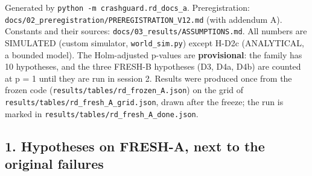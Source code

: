 


Generated by \texttt{python -m crashguard.rd\_docs\_a}. Preregistration: \texttt{docs/02\_preregistration/PREREGISTRATION\_V12.md} (with addendum A). Constants and their sources: \texttt{docs/03\_results/ASSUMPTIONS.md}. All numbers are SIMULATED (custom simulator, \texttt{world\_sim.py}) except H-D2c (ANALYTICAL, a bounded model).
The Holm-adjusted p-values are \textbf{provisional}: the family has 10 hypotheses, and the three FRESH-B hypotheses (D3, D4a, D4b) are counted at p = 1 until they are run in session 2. Results were produced once from the frozen code (\texttt{results/tables/rd\_frozen\_A.json}) on the grid of \texttt{results/tables/rd\_fresh\_A\_grid.json}, drawn after the freeze; the run is marked in \texttt{results/tables/rd\_fresh\_A\_done.json}.

\subsection*{1. Hypotheses on FRESH-A, next to the original failures}

